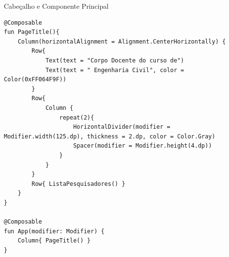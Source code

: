 \documentclass[aspectratio=169]{beamer}
\begin{document}
\begin{frame}[fragile]{Cabeçalho e Componente Principal}
  \begin{lstlisting}[style=KotlinStyle, basicstyle=\ttfamily\tiny]
@Composable
fun PageTitle(){
    Column(horizontalAlignment = Alignment.CenterHorizontally) {
        Row{
            Text(text = "Corpo Docente do curso de")
            Text(text = " Engenharia Civil", color = Color(0xFF064F9F))
        }
        Row{
            Column {
                repeat(2){
                    HorizontalDivider(modifier = Modifier.width(125.dp), thickness = 2.dp, color = Color.Gray)
                    Spacer(modifier = Modifier.height(4.dp))
                }
            }
        }
        Row{ ListaPesquisadores() }
    }
}

@Composable
fun App(modifier: Modifier) {
    Column{ PageTitle() }
}
  \end{lstlisting}
\end{frame}
\end{document}

